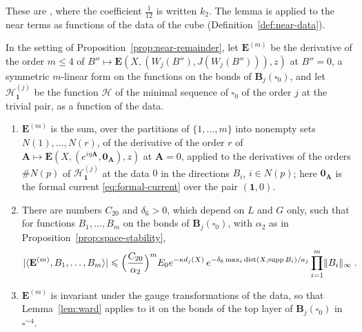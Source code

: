\documentclass[11pt]{preprint}
\newcommand{\id}{\mathbf 1}
\newcommand{\dist}{\operatorname{dist}}
\DeclarePairedDelimiter{\abs}{\lvert}{\rvert}
\DeclarePairedDelimiter{\norm}{\lVert}{\rVert}
\numberwithin{equation}{section}
\begin{document}
These are \cite[(4.9)--(4.15), pp.~283--284]{BalabanRG1}, where the coefficient $\frac{1}{12}$ is written $k_2$. The lemma is applied to the near terms as functions of the data of the cube (Definition~\ref{def:near-data}).

\begin{proposition}\label{prop:near-derivatives}
In the setting of Proposition~\ref{prop:near-remainder}, let $\mathbf E^{(m)}$ be the derivative of the order $m \leqslant 4$ of $B'' \mapsto \mathbf E(X, (W_j(B''), J(W_j(B''))), z)$ at $B'' = 0$, a symmetric $m$-linear form on the functions on the bonds of $\mathbf B_j(\square_0)$, and let $\mathcal H^{(j)}_{\id}$ be the function $\mathcal H$ of the minimal sequence of $\square_0$ of the order $j$ at the trivial pair, as a function of the data.
\begin{enumerate}[label=(\roman*)]
\item $\mathbf E^{(m)}$ is the sum, over the partitions of $\{ 1, \dots, m \}$ into nonempty sets $N(1), \dots, N(r)$, of the derivative of the order $r$ of $\mathbf A \mapsto \mathbf E(X, (e^{i\eta\mathbf A}, \mathbf 0_{\mathbf A}), z)$ at $\mathbf A = 0$, applied to the derivatives of the orders $\#N(p)$ of $\mathcal H^{(j)}_{\id}$ at the data $0$ in the directions $B_i$, $i \in N(p)$; here $\mathbf 0_{\mathbf A}$ is the formal current \eqref{eq:formal-current} over the pair $(\id, 0)$.
\item There are numbers $C_{20}$ and $\delta_6 > 0$, which depend on $L$ and $G$ only, such that for functions $B_1, \dots, B_m$ on the bonds of $\mathbf B_j(\square_0)$, with $\alpha_2$ as in Proposition~\ref{prop:space-stability},
\begin{equation}\label{eq:near-derivatives}
    \abs{\langle\mathbf E^{(m)}, B_1, \dots, B_m\rangle} \leqslant \Bigl(\frac{C_{20}}{\alpha_2}\Bigr)^mE_0e^{-\kappa d_j(X)}\,e^{-\delta_6\max_i\dist(X, \operatorname{supp}B_i)/a_j}\prod_{i=1}^m\norm{B_i}_\infty\;.
\end{equation}
\item $\mathbf E^{(m)}$ is invariant under the gauge transformations of the data, so that Lemma~\ref{lem:ward} applies to it on the bonds of the top layer of $\mathbf B_j(\square_0)$ in $\square^{\sim4}$.
\end{enumerate}
\end{proposition}
\end{document}
